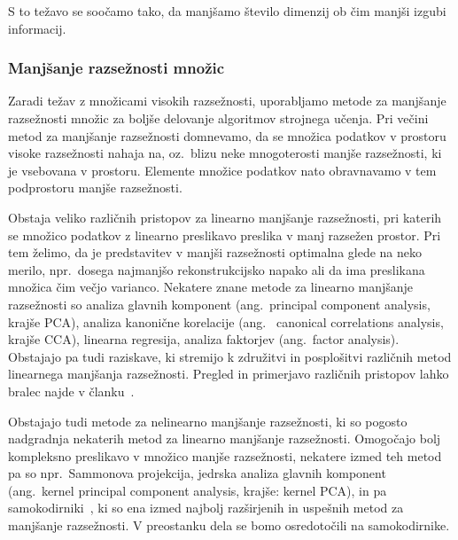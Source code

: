\documentclass[12pt,a4paper,twoside]{article}
\theoremstyle{definition} %
\theoremstyle{plain} %
\numberwithin{equation}{section}  %
\begin{document}
S to težavo se soočamo tako, da manjšamo število dimenzij ob čim manjši izgubi informacij.


\subsubsection{Manjšanje razsežnosti množic}

Zaradi težav z množicami visokih razsežnosti, uporabljamo metode za manjšanje razsežnosti množic za boljše delovanje algoritmov strojnega učenja. 
Pri večini metod za manjšanje razsežnosti domnevamo, da se množica podatkov v prostoru visoke razsežnosti nahaja na, 
oz.~blizu neke mnogoterosti manjše razsežnosti, ki je vsebovana v prostoru. %
Elemente množice podatkov nato obravnavamo v tem podprostoru manjše razsežnosti.

Obstaja veliko različnih pristopov za linearno manjšanje razsežnosti, pri katerih se množico podatkov z linearno preslikavo preslika v manj razsežen prostor. 
Pri tem želimo, da je predstavitev v manjši razsežnosti optimalna glede na neko merilo, npr.\ dosega najmanjšo rekonstrukcijsko napako ali da ima preslikana množica čim večjo varianco. 
Nekatere znane metode za linearno manjšanje razsežnosti so analiza glavnih komponent (ang.~principal component analysis, krajše PCA), 
analiza kanonične korelacije (ang.~ canonical correlations analysis, krajše CCA), linearna regresija, analiza faktorjev (ang.~factor analysis).
Obstajajo pa tudi raziskave, ki stremijo k združitvi in posplošitvi različnih metod linearnega manjšanja razsežnosti. 
Pregled in primerjavo različnih pristopov lahko bralec najde v članku~\cite{JMLR:cunningham2015a}.

Obstajajo tudi metode za nelinearno manjšanje razsežnosti, ki so pogosto nadgradnja nekaterih metod za linearno manjšanje razsežnosti. 
Omogočajo bolj kompleksno preslikavo v množico manjše razsežnosti, nekatere izmed teh metod pa so npr.\ Sammonova projekcija, 
jedrska analiza glavnih komponent (ang.~kernel principal component analysis, krajše: kernel PCA), in pa samokodirniki~\cite{charte2018autoencoders}, ki so ena izmed najbolj razširjenih in uspešnih metod za manjšanje razsežnosti. 
V preostanku dela se bomo osredotočili na samokodirnike.
\end{document}
